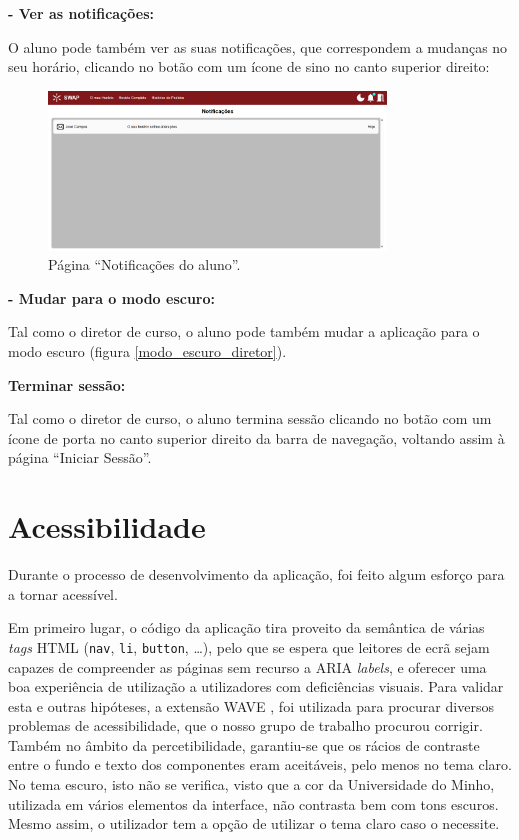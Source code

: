 \documentclass[12pt, a4paper]{article}
\begin{document}
\textbf{- Ver as notificações:}

O aluno pode também ver as suas notificações, que correspondem a mudanças no seu horário, clicando
no botão com um ícone de sino no canto superior direito:

\begin{figure}[H]
    \centering
    \includegraphics[width=0.8\textwidth]{res/manual/notificacoes_aluno.png}
    \caption{Página ``Notificações do aluno''.}
    \label{notificacoes_aluno}
\end{figure}

\textbf{- Mudar para o modo escuro:}

Tal como o diretor de curso, o aluno pode também mudar a aplicação para o modo escuro (figura
\ref{modo_escuro_diretor}).

\textbf{Terminar sessão:}

Tal como o diretor de curso, o aluno termina sessão clicando no botão com um ícone de porta no
canto superior direito da barra de navegação, voltando assim à página ``Iniciar Sessão''.

\section{Acessibilidade}

Durante o processo de desenvolvimento da aplicação, foi feito algum esforço para a tornar acessível.

Em primeiro lugar, o código da aplicação tira proveito da semântica de várias \emph{tags} HTML
(\texttt{nav}, \texttt{li}, \texttt{button}, \ldots), pelo que se espera que leitores de ecrã sejam
capazes de compreender as páginas sem recurso a ARIA \emph{labels}, e oferecer uma boa experiência
de utilização a utilizadores com deficiências visuais. Para validar esta e outras hipóteses, a
extensão WAVE \cite{wave}, foi utilizada para procurar diversos problemas de acessibilidade, que o
nosso grupo de trabalho procurou corrigir. Também no âmbito da percetibilidade, garantiu-se que os
rácios de contraste entre o fundo e texto dos componentes eram aceitáveis, pelo menos no tema claro.
No tema escuro, isto não se verifica, visto que a cor da Universidade do Minho, utilizada em vários
elementos da interface, não contrasta bem com tons escuros. Mesmo assim, o utilizador tem a opção de
utilizar o tema claro caso o necessite.
\end{document}
